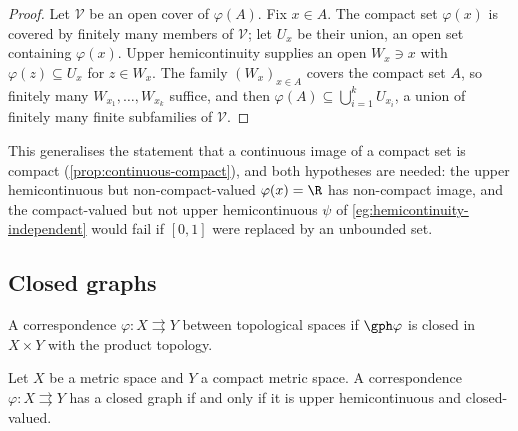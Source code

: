 \begin{proof}
	Let $\mathcal{V}$ be an open cover of $\varphi(A)$. Fix $x\in A$. The compact set
	$\varphi(x)$ is covered by finitely many members of $\mathcal{V}$; let $U_x$ be
	their union, an open set containing $\varphi(x)$. Upper hemicontinuity supplies
	an open $W_x\ni x$ with $\varphi(z)\subseteq U_x$ for $z\in W_x$. The family
	$(W_x)_{x\in A}$ covers the compact set $A$, so finitely many
	$W_{x_1},\dots,W_{x_k}$ suffice, and then
	$\varphi(A)\subseteq\bigcup_{i=1}^{k}U_{x_i}$, a union of finitely many finite
	subfamilies of $\mathcal{V}$.
\end{proof}

This generalises the statement that a continuous image of a compact set is
compact (\autoref{prop:continuous-compact}), and both hypotheses are needed: the
upper hemicontinuous but non-compact-valued $\varphi(x)=\R$ has non-compact
image, and the compact-valued but not upper hemicontinuous $\psi$ of
\autoref{eg:hemicontinuity-independent} would fail if $[0,1]$ were replaced by an
unbounded set.

\subsection{Closed graphs}

\begin{definition}\label{def:closed-graph}
	A correspondence $\varphi\colon X\rightrightarrows Y$ between topological spaces
	 if $\gph\varphi$ is closed in
	$X\times Y$ with the product topology.
\end{definition}

\begin{theorem}\label{thm:closed-graph}
	Let $X$ be a metric space and $Y$ a compact metric space. A correspondence
	$\varphi\colon X\rightrightarrows Y$ has a closed graph if and only if it is
	upper hemicontinuous and closed-valued.
\end{theorem}

